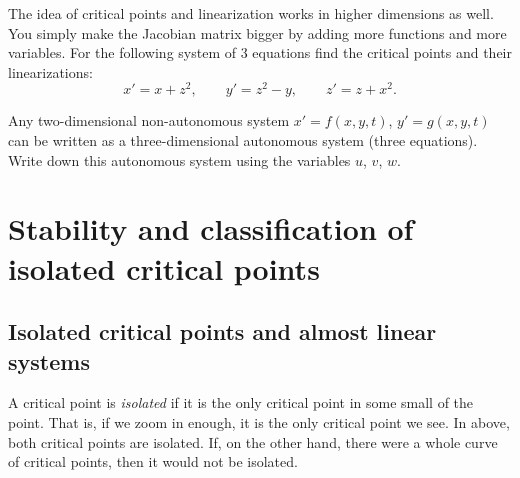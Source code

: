 \begin{samepage}
\begin{exercise}
The idea of critical points and linearization works in higher dimensions as
well.  You simply make the Jacobian matrix bigger by adding more functions
and more variables.  For the following system
of 3 equations find the critical points and their linearizations:
\begin{equation*}
x' = x + z^2, \qquad y' = z^2-y, \qquad z' = z+x^2.
\end{equation*}
\end{exercise}
\end{samepage}

\begin{exercise}
Any two-dimensional non-autonomous system $x'=f(x,y,t)$, $y'=g(x,y,t)$ can
be written as a three-dimensional autonomous system (three equations).  Write down this
autonomous system using the variables $u$, $v$, $w$.
\end{exercise}


\sectionnewpage
\section{Stability and classification of isolated critical points}
\label{nlinstability:section}



\subsection{Isolated critical points and almost linear systems}

A critical point is
\emph{isolated}
if it is the only critical point in some small
 of the point.
That is, if we zoom in enough, it is the
only critical point we see.
In  above,
both critical points are isolated.
If, on the other hand, there were a whole curve of critical
points, then it would not be isolated.

